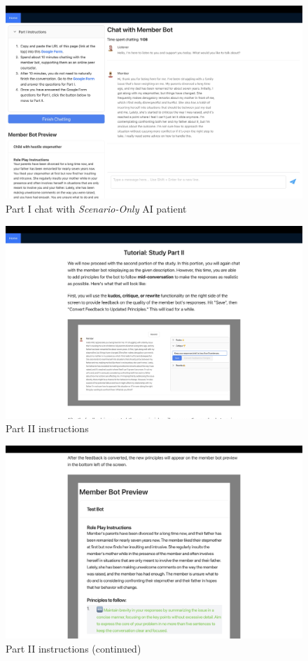 \documentclass[11pt]{article}
\begin{document}
\begin{figure}[ht]
    \centering
    \includegraphics[width=\textwidth]{Study_Screenshots/Screen5.jpeg}
    \caption{Part I chat with \textit{Scenario-Only} AI patient}
    \label{fig:screen5}
\end{figure}

\begin{figure}[ht]
    \centering
    \includegraphics[width=\textwidth]{Study_Screenshots/Screen6.jpeg}
    \caption{Part II instructions}
    \label{fig:screen6}
\end{figure}

\begin{figure}[ht]
    \centering
    \includegraphics[width=\textwidth]{Study_Screenshots/Screen7.jpeg}
    \caption{Part II instructions (continued)}
    \label{fig:screen7}
\end{figure}
\end{document}
